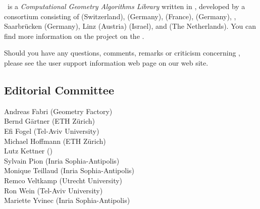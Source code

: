 
\cgal\ is a {\em Computational Geometry Algorithms Library} written in \CC, 
developed by a consortium consisting of
 (Switzerland), 
 (Germany), 
 (France),
 (Germany),
,
Saarbr\"ucken (Germany),
 Linz (Austria)
 (Israel), and
 (The Netherlands). 
You can find more information on the project on the 
.

Should you have any questions, comments, remarks or criticism concerning 
\cgal, please see the user support information web page on our web site.

\subsection*{Editorial Committee}

Andreas Fabri ({\sc Geometry Factory}) \\
Bernd G\"artner (ETH Z\"urich) \\
Efi Fogel (Tel-Aviv University) \\
Michael Hoffmann (ETH Z\"urich) \\
Lutz Kettner ()\\
Sylvain Pion ({\sc Inria} Sophia-Antipolis)\\
Monique Teillaud ({\sc Inria} Sophia-Antipolis)\\
Remco Veltkamp (Utrecht University)\\
Ron Wein (Tel-Aviv University)\\
Mariette Yvinec ({\sc Inria} Sophia-Antipolis)\\


